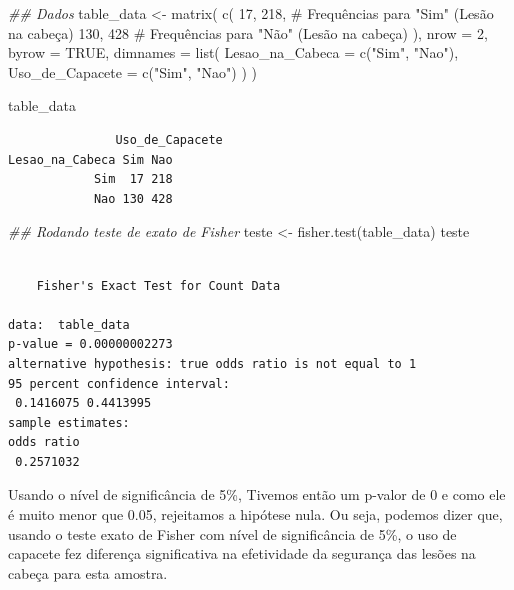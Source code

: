 \documentclass[
  letterpaper,
  DIV=11,
  numbers=noendperiod]{scrartcl}
\newenvironment{Shaded}{\begin{snugshade}}{\end{snugshade}}
\newcommand{\AttributeTok}[1]{\textcolor[rgb]{0.40,0.45,0.13}{#1}}
\newcommand{\CommentTok}[1]{\textcolor[rgb]{0.37,0.37,0.37}{#1}}
\newcommand{\ConstantTok}[1]{\textcolor[rgb]{0.56,0.35,0.01}{#1}}
\newcommand{\DecValTok}[1]{\textcolor[rgb]{0.68,0.00,0.00}{#1}}
\newcommand{\DocumentationTok}[1]{\textcolor[rgb]{0.37,0.37,0.37}{\textit{#1}}}
\newcommand{\FunctionTok}[1]{\textcolor[rgb]{0.28,0.35,0.67}{#1}}
\newcommand{\NormalTok}[1]{\textcolor[rgb]{0.00,0.23,0.31}{#1}}
\newcommand{\OtherTok}[1]{\textcolor[rgb]{0.00,0.23,0.31}{#1}}
\newcommand{\StringTok}[1]{\textcolor[rgb]{0.13,0.47,0.30}{#1}}
\begin{document}
\begin{Shaded}
\begin{Highlighting}[]
\DocumentationTok{\#\# Dados}
\NormalTok{table\_data }\OtherTok{\textless{}{-}} \FunctionTok{matrix}\NormalTok{(}
  \FunctionTok{c}\NormalTok{(}
    \DecValTok{17}\NormalTok{, }\DecValTok{218}\NormalTok{,  }\CommentTok{\# Frequências para "Sim" (Lesão na cabeça)}
    \DecValTok{130}\NormalTok{, }\DecValTok{428}  \CommentTok{\# Frequências para "Não" (Lesão na cabeça)}
\NormalTok{  ),}
  \AttributeTok{nrow =} \DecValTok{2}\NormalTok{, }\AttributeTok{byrow =} \ConstantTok{TRUE}\NormalTok{,}
  \AttributeTok{dimnames =} \FunctionTok{list}\NormalTok{(}
    \AttributeTok{Lesao\_na\_Cabeca =} \FunctionTok{c}\NormalTok{(}\StringTok{"Sim"}\NormalTok{, }\StringTok{"Nao"}\NormalTok{),}
    \AttributeTok{Uso\_de\_Capacete =} \FunctionTok{c}\NormalTok{(}\StringTok{"Sim"}\NormalTok{, }\StringTok{"Nao"}\NormalTok{)}
\NormalTok{  )}
\NormalTok{)}

\NormalTok{table\_data}
\end{Highlighting}
\end{Shaded}

\begin{verbatim}
               Uso_de_Capacete
Lesao_na_Cabeca Sim Nao
            Sim  17 218
            Nao 130 428
\end{verbatim}

\begin{Shaded}
\begin{Highlighting}[]
\DocumentationTok{\#\# Rodando teste de exato de Fisher}
\NormalTok{teste }\OtherTok{\textless{}{-}} \FunctionTok{fisher.test}\NormalTok{(table\_data)}
\NormalTok{teste}
\end{Highlighting}
\end{Shaded}

\begin{verbatim}

    Fisher's Exact Test for Count Data

data:  table_data
p-value = 0.00000002273
alternative hypothesis: true odds ratio is not equal to 1
95 percent confidence interval:
 0.1416075 0.4413995
sample estimates:
odds ratio 
 0.2571032 
\end{verbatim}

Usando o nível de significância de 5\%, Tivemos então um p-valor de 0 e
como ele é muito menor que 0.05, rejeitamos a hipótese nula. Ou seja,
podemos dizer que, usando o teste exato de Fisher com nível de
significância de 5\%, o uso de capacete fez diferença significativa na
efetividade da segurança das lesões na cabeça para esta amostra.
\end{document}
